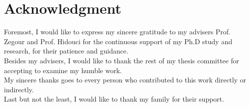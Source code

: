 \chapter*{Acknowledgment}

\noindent
Foremost, I would like to express my sincere gratitude to my advisers Prof. Zegour and Prof. Hidouci for the continuous support of my Ph.D study and research, for their patience and guidance.\\[.25cm]

\noindent
Besides my advisers, I would like to thank the rest of my thesis committee for accepting to examine my humble work.\\[.25cm]

\noindent
My sincere thanks goes to every person who contributed to this work directly or indirectly.\\[.25cm]

\noindent
Last but not the least, I would like to thank my family for their support.
